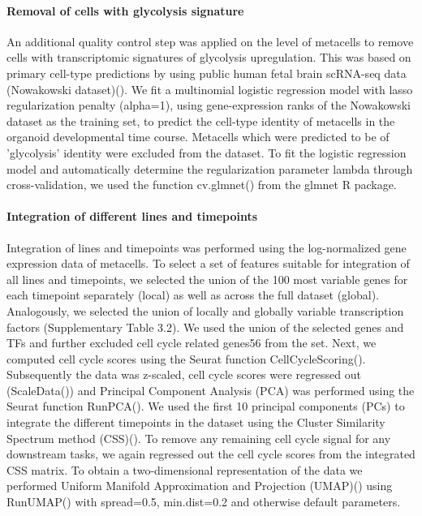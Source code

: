  
\paragraph{Removal of cells with glycolysis signature}
An additional quality control step was applied on the level of metacells to remove cells with transcriptomic signatures of glycolysis upregulation. This was based on primary cell-type predictions by using public human fetal brain scRNA-seq data (Nowakowski dataset)(\cite{nowakowski_spatiotemporal_2017}). We fit a multinomial logistic regression model with lasso regularization penalty (alpha=1), using gene-expression ranks of the Nowakowski dataset as the training set, to predict the cell-type identity of metacells in the organoid developmental time course. Metacells which were predicted to be of 'glycolysis' identity were excluded from the dataset. To fit the logistic regression model and automatically determine the regularization parameter lambda through cross-validation, we used the function cv.glmnet() from the glmnet R package.
 
 
\paragraph{Integration of different lines and timepoints}
Integration of lines and timepoints was performed using the log-normalized gene expression data of metacells. To select a set of features suitable for integration of all lines and timepoints, we selected the union of the 100 most variable genes for each timepoint separately (local) as well as across the full dataset (global). Analogously, we selected the union of locally and globally variable transcription factors (Supplementary Table 3.2). We used the union of the selected genes and TFs and further excluded cell cycle related genes56 from the set. Next, we computed cell cycle scores using the Seurat function CellCycleScoring(). Subsequently the data was z-scaled, cell cycle scores were regressed out (ScaleData()) and Principal Component Analysis (PCA) was performed using the Seurat function RunPCA(). We used the first 10 principal components (PCs) to integrate the different timepoints in the dataset using the Cluster Similarity Spectrum method (CSS)(\cite{he_css_2020}). To remove any remaining cell cycle signal for any downstream tasks, we again regressed out the cell cycle scores from the integrated CSS matrix. To obtain a two-dimensional representation of the data we performed Uniform Manifold Approximation and Projection (UMAP)(\cite{becht_dimensionality_2019}) using RunUMAP() with spread=0.5, min.dist=0.2 and otherwise default parameters.
 
